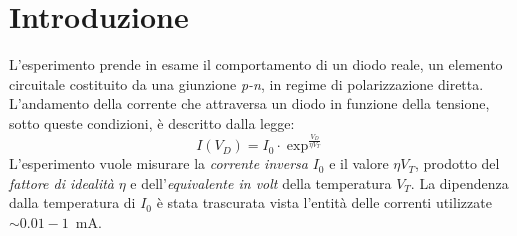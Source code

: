 \documentclass[@SRC@/main]{subfiles}
\begin{document}
    \section{Introduzione} \label{sec:introduzione}
    L'esperimento prende in esame il comportamento di un diodo reale, un elemento circuitale
    costituito da una giunzione \textit{p-n}, in regime di polarizzazione diretta.
    L'andamento della corrente che attraversa un diodo in funzione della tensione,
    sotto queste condizioni, è descritto dalla legge:
    \begin{equation}
        \label{eq:caratteristiche}
        I(V_D) = I_0\cdot \exp^{\frac{V_D}{\eta V_T}}
    \end{equation}
    L'esperimento vuole misurare la \textit{corrente inversa} $I_0$ e il valore
    $\eta V_T$, prodotto del \textit{fattore di idealità} $\eta$ e
    dell'\textit{equivalente in volt} della temperatura $V_T$.
    La dipendenza dalla temperatura di $I_0$ è stata trascurata vista l'entità
    delle correnti utilizzate $\sim 0.01-1$~mA.
\end{document}
